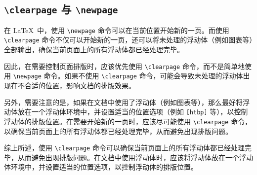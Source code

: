 \subsection{\texttt{\textbackslash{}clearpage} 与 \texttt{\textbackslash{}newpage}}

在 \LaTeX\ 中，使用 \verb|\newpage| 命令可以在当前位置开始新的一页。而使用 \verb|\clearpage| 命令不仅可以开始新的一页，还可以将未处理的浮动体（例如图表等）全部输出，确保当前页面上的所有浮动体都已经处理完毕。

因此，在需要控制页面排版时，应该优先使用 \verb|\clearpage| 命令，而不是简单地使用 \verb|\newpage| 命令。如果不使用 \verb|\clearpage| 命令，可能会导致未处理的浮动体出现在不合适的位置，影响文档的排版效果。

另外，需要注意的是，如果在文档中使用了浮动体（例如图表等），那么最好将浮动体放在一个浮动体环境中，并设置适当的位置选项（例如 \verb|[htbp]| 等），以控制浮动体的排版位置。在需要开始新的一页时，应该尽可能使用 \verb|\clearpage| 命令，以确保当前页面上的所有浮动体都已经处理完毕，从而避免出现排版问题。

综上所述，使用 \verb|\clearpage| 命令可以确保当前页面上的所有浮动体都已经处理完毕，从而避免出现排版问题。在文档中使用浮动体时，应该将浮动体放在一个浮动体环境中，并设置适当的位置选项，以控制浮动体的排版位置。